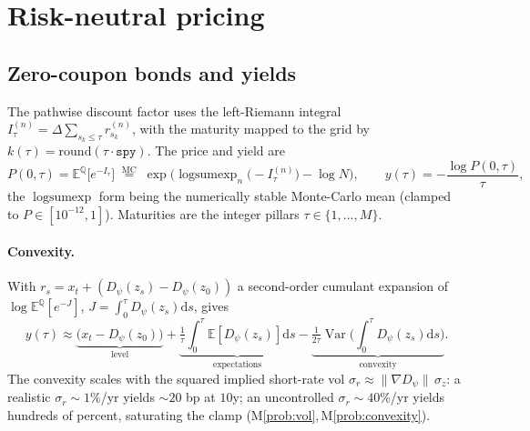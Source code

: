 \documentclass[11pt]{article}
\newcommand{\QQ}{\mathbb{Q}}
\newcommand{\E}{\mathbb{E}}
\newcommand{\dd}{\mathrm{d}}
\DeclareMathOperator*{\lse}{logsumexp}
\DeclareMathOperator{\Var}{Var}
\begin{document}
\section{Risk-neutral pricing}\label{sec:pricing}

\subsection{Zero-coupon bonds and yields}
The pathwise discount factor uses the left-Riemann integral
$I^{(n)}_\tau=\Delta\sum_{s_k\le\tau} r^{(n)}_{s_k}$, with the maturity mapped
to the grid by $k(\tau)=\mathrm{round}(\tau\cdot\texttt{spy})$. The price and
yield are
\begin{equation}
P(0,\tau)=\E^{\QQ}\!\big[e^{-I_\tau}\big]
\;\overset{\text{MC}}{=}\; \exp\!\Big(\lse_{n}\big(-I^{(n)}_\tau\big)-\log N\Big),
\qquad y(\tau)=-\frac{\log P(0,\tau)}{\tau},
\end{equation}
the $\lse$ form being the numerically stable Monte-Carlo mean (clamped to
$P\in[10^{-12},1]$). Maturities are the integer pillars $\tau\in\{1,\dots,M\}$.

\paragraph{Convexity.} With $r_s=x_t+(D_\psi(z_s)-D_\psi(z_0))$ a second-order
cumulant expansion of $\log\E^{\QQ}[e^{-J}]$, $J=\int_0^\tau D_\psi(z_s)\dd s$,
gives
\begin{equation}
y(\tau)\approx
\underbrace{\big(x_t-D_\psi(z_0)\big)}_{\text{level}}
+\underbrace{\tfrac1\tau\!\int_0^\tau\!\E[D_\psi(z_s)]\dd s}_{\text{expectations}}
-\underbrace{\tfrac1{2\tau}\Var\!\Big(\!\int_0^\tau\! D_\psi(z_s)\dd s\Big)}_{\text{convexity}} .
\label{eq:convexity}
\end{equation}
The convexity scales with the squared implied short-rate vol
$\sigma_r\approx\lVert\nabla D_\psi\rVert\,\sigma_z$: a realistic
$\sigma_r\sim1\%$/yr yields $\sim 20$ bp at $10$y; an uncontrolled
$\sigma_r\sim40\%$/yr yields hundreds of percent, saturating the clamp
(M\ref{prob:vol},\,M\ref{prob:convexity}).
\end{document}
